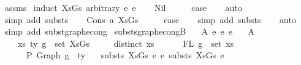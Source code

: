 \begin{isabellebody}
\ assms\isanewline
{}\isamarkupfalse%
\ {\isacharparenleft}{\kern0pt}induct\ XsGs\ arbitrary{\isacharcolon}{\kern0pt}\ e{}\ e{}{\isacharparenright}{\kern0pt}\isanewline
\ \ \isamarkupfalse%
\ Nil\isanewline
\ \ \isamarkupfalse%
\ \isamarkupfalse%
\ {\isacharquery}{\kern0pt}case\isanewline
\ \ \isamarkupfalse%
\ auto\isanewline
\ \ \isamarkupfalse%
\ {\isacharparenleft}{\kern0pt}simp\ add{\isacharcolon}{\kern0pt}\ substs{\isacharparenright}{\kern0pt}\isanewline
{}\isamarkupfalse%
\isanewline
\ \ \isamarkupfalse%
\ {\isacharparenleft}{\kern0pt}Cons\ a\ XsGs{\isacharparenright}{\kern0pt}\isanewline
\ \ \isamarkupfalse%
\ \isamarkupfalse%
\ {\isacharquery}{\kern0pt}case\isanewline
\ \ \isamarkupfalse%
\ {\isacharparenleft}{\kern0pt}simp\ add{\isacharcolon}{\kern0pt}\ substs{\isacharparenright}{\kern0pt}\isanewline
\ \ \isamarkupfalse%
\ auto\isanewline
\ \ \isamarkupfalse%
\ {\isacharparenleft}{\kern0pt}simp\ add{\isacharcolon}{\kern0pt}\ subst{\isacharunderscore}{\kern0pt}graph{\isacharunderscore}{\kern0pt}econg{}{\isacharparenright}{\kern0pt}\isanewline
{}\isamarkupfalse%
%
\endisatagproof
{\isafoldproof}%
%
\isadelimproof
\isanewline
%
\endisadelimproof
\isanewline
\isanewline
{}\isamarkupfalse%
\ substs{\isacharunderscore}{\kern0pt}graph{\isacharunderscore}{\kern0pt}econg{}B{\isacharcolon}{\kern0pt}\isanewline
\ \ \ A{}{\isacharcolon}{\kern0pt}\ {\isachardoublequoteopen}e{}\ {\isasymsimeq}e\ e{}{\isachardoublequoteclose}\isanewline
\ \ \ A{}{\isacharcolon}{\kern0pt}\isanewline
\ \ \ \ {\isachardoublequoteopen}{\isasymforall}{\isacharparenleft}{\kern0pt}{\isacharparenleft}{\kern0pt}xs{\isacharcomma}{\kern0pt}\ ty{\isacharparenright}{\kern0pt}{\isacharcomma}{\kern0pt}\ g{\isacharparenright}{\kern0pt}\ {\isasymin}\ set\ XsGs{\isachardot}{\kern0pt}\isanewline
\ \ \ \ \ distinct\ xs\ {\isasymand}\isanewline
\ \ \ \ \ FL\ g\ {\isacharequal}{\kern0pt}\ set\ xs\ {\isasymand}\isanewline
\ \ \ \ \ {\isacharbrackleft}{\kern0pt}{\isacharbrackright}{\kern0pt}\ {\isasymturnstile}{\isacharbraceleft}{\kern0pt}P{\isacharbraceright}{\kern0pt}\ Graph\ g\ {\isacharcolon}{\kern0pt}\ ty{\isachardoublequoteclose}\isanewline
\ \ \ {\isachardoublequoteopen}substs\ XsGs\ e{}\ {\isasymsimeq}e\ substs\ XsGs\ e{}{\isachardoublequoteclose}\isanewline

\end{isabellebody}
